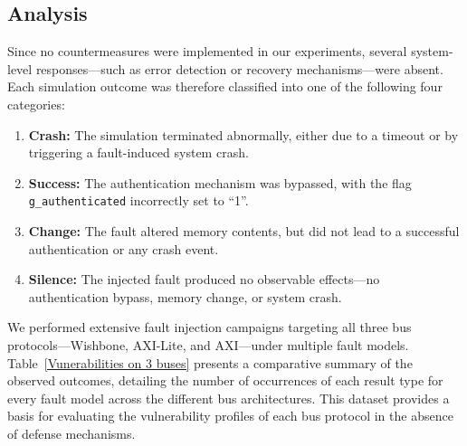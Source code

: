\subsection{Analysis}

Since no countermeasures were implemented in our experiments, several system-level responses—such as error detection or recovery mechanisms—were absent. Each simulation outcome was therefore classified into one of the following four categories:

\begin{enumerate}
\item \textbf{Crash:} The simulation terminated abnormally, either due to a timeout or by triggering a fault-induced system crash.
\item \textbf{Success:} The authentication mechanism was bypassed, with the flag \texttt{g\_authenticated} incorrectly set to “1”.
\item \textbf{Change:} The fault altered memory contents, but did not lead to a successful authentication or any crash event.
\item \textbf{Silence:} The injected fault produced no observable effects—no authentication bypass, memory change, or system crash.
\end{enumerate}

We performed extensive fault injection campaigns targeting all three bus protocols—Wishbone, AXI-Lite, and AXI—under multiple fault models. Table~\ref{Vunerabilities on 3 buses} presents a comparative summary of the observed outcomes, detailing the number of occurrences of each result type for every fault model across the different bus architectures. This dataset provides a basis for evaluating the vulnerability profiles of each bus protocol in the absence of defense mechanisms.

